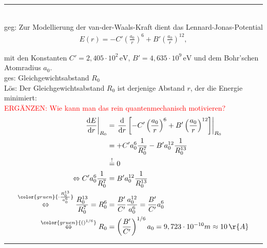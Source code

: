 \documentclass{article}
\newcommand{\diff}{\mathrm{d}}
\newcommand{\lr}[1]{\left(#1\right)}
\newcommand{\lreck}[1]{\left[#1\right]}
\newcommand{\comment}[1]{{\color{gruen}{#1}}}
\begin{document}
\newpage


{\color{blue}
\hrule
	\\
	geg: Zur Modellierung der van-der-Waals-Kraft dient das Lennard-Jonas-Potential
		\begin{align*}
			E(r) = -C' \lr{ \frac{a_0}{r} }^6 + B' \lr{ \frac{a_0}{r} }^{12},
		\end{align*}
	
	mit den Konstanten $C' = 2,405 \cdot 10^2 \, \text{eV}$, $B' = 4,635 \cdot 10^9 \, \text{eV}$ und dem Bohr'schen Atomradius $a_0$.\\
	ges: Gleichgewichtsabstand $R_0$ \\
	Lös: Der Gleichgewichtsabstand $R_0$ ist derjenige Abstand $r$, der die Energie minimiert:\\
	\textcolor{red}{ERGÄNZEN: Wie kann man das rein quantenmechanisch motivieren?}
		\begin{align*}
			\left. \frac{\diff E}{\diff r} \right|_{R_0} &= \left. \frac{\diff}{\diff r} \lreck{ -C' \lr{ \frac{a_0}{r} }^6 + B' \lr{ \frac{a_0}{r} }^{12} } \right|_{R_0} \\
			&= +C' a_0^6 \frac{1}{R_0^7} - B' a_0^{12} \frac{1}{R_0^{13}} \\
			&\stackrel{!}{=} 0 \\
			\Leftrightarrow C' a_0^6 \frac{1}{R_0^7} &= B' a_0^{12} \frac{1}{R_0^{13}} \\
			\stackrel{ \comment{\cdot \frac{R_0^{13}}{a_0^6}} }{\Leftrightarrow} \frac{R_0^{13}}{R_0^7} = R_0^6 &= \frac{B'}{C'} \frac{a_0^{12}}{a_0^6} = \frac{B'}{C'} a_0^6 \\
			\stackrel{ \comment{ ()^{1/6} } }{\Leftrightarrow} R_0 &= \lr{ \frac{B'}{C'} }^{1/6} a_0 = 9,723 \cdot 10^{-10} m \approx 10 \, \r{A}
		\end{align*}
\hrule
}

\vspace{0.5cm}
\end{document}
